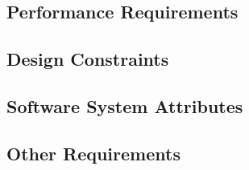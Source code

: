 \documentclass{article}
\begin{document}
	
	
	\subsection{Performance Requirements}
	\subsection{Design Constraints}
	\subsection{Software System Attributes}
	\subsection{Other Requirements}
	
	
	
\end{document}
